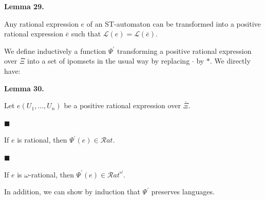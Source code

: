  
 
\par\medskip\noindent\textbf{Lemma 29.}\par
 
 
Any rational expression $e$ of an ST-automaton can be transformed into a positive rational expression $\overline{e}$ such that $\mathcal{L}(e)=\mathcal{L}(\overline{e})$.\par
 
 
 
 
We define inductively a function $\Psi^{\prime}$ transforming a positive rational expression over $\overline{\Xi}$ into a set of ipomsets in the usual way by replacing $\cdot$ by $*$. We directly have:\par
 
 
 
\par\medskip\noindent\textbf{Lemma 30.}\par
 
 
Let $e(U_{1},...,U_{n})$ be a positive rational expression over $\overline{\Xi}$.\par
  
\par\noindent  $\blacksquare$ 
 
If $e$ is rational, then $\Psi^{\prime}(e)\in\mathcal{R}at$.\par
 
 
 
\par\noindent  $\blacksquare$ 
 
If $e$ is $\omega$-rational, then $\Psi^{\prime}(e)\in{\mathcal{R}at}^{\omega}$.\par
 
 
  
 
 
 
In addition, we can show by induction that $\Psi^{\prime}$ preserves languages.\par
 
